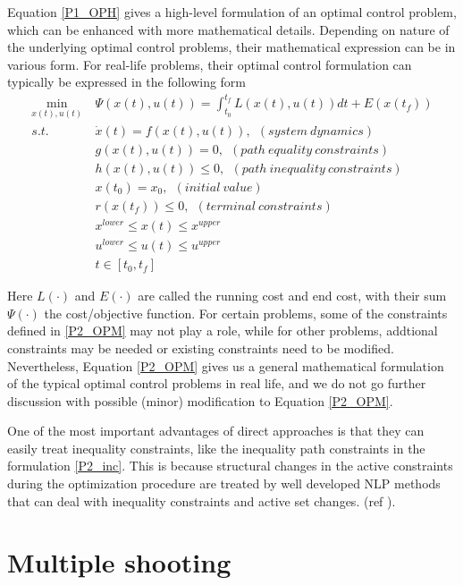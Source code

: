 \documentclass  [
  paper    = a4,
  BCOR     = 10mm,
  twoside,
  fontsize = 12pt,
  fleqn,
  toc      = bibnumbered,
  toc      = listofnumbered,
  numbers  = noendperiod,
  headings = normal,
  listof   = leveldown,
  version  = 3.03
]                                       {scrreprt}
\newcommand{\<}{\langle}
\renewcommand{\>}{\rangle}
\begin{document}
Equation \ref{P1_OPH} gives a high-level formulation of an optimal control problem, which can be enhanced with more mathematical details. Depending on nature of the underlying optimal control problems, their mathematical expression can be in various form. For real-life problems, their optimal control formulation can typically be expressed in the following form  
\begin{subequations}
	\begin{align}
		\underset{x(t), u(t)}{\text{min}}   \ &  \Psi(x(t), u(t))  = \int_{t_0}^{t_f}L(x(t), u(t))dt + E (x(t_f))\\
		s.t.\ \ &  \dot{x} (t) = f(x(t), u(t)), \ \ (system \ dynamics)   \label{P2_sd} \\
		& g(x(t), u(t)) = 0, \ \  (path\  equality\  constraints)  \label{P2_ec}\\
		& h(x(t), u(t)) \leq 0, \ \ (path\  inequality \ constraints)  \label{P2_inc}\\
		& x(t_0) = x_0, \ \ (initial \ value) \\
		& r(x(t_f)) \leq 0, \ \ (terminal \ constraints) \\
		& x^{lower} \leq x(t) \leq x^{upper}    \\ 
		& u^{lower} \leq u(t) \leq u^{upper}    \\ 
		& t \in [t_0, t_f]
	\end{align}
	\label{P2_OPM}
\end{subequations}

Here $L(\cdot)$ and $E(\cdot)$ are called the running cost and end cost, with their sum $\Psi(\cdot)$ the cost/objective function. For certain problems, some of the constraints defined in \ref{P2_OPM} may not play a role, while for other problems, addtional constraints may be needed or existing constraints need to be modified. Nevertheless, Equation \ref{P2_OPM} gives us a general mathematical formulation of the typical optimal control problems in real life, and we do not go further discussion with possible (minor) modification to Equation \ref{P2_OPM}. 

One of the most important advantages of direct approaches is that they can easily treat inequality constraints, like the inequality path constraints in the formulation \ref{P2_inc}. This is because structural changes in the active constraints during the optimization procedure are treated by well developed NLP methods that can deal with inequality constraints and active set changes. (ref \cite{MHHP05}).

\section{Multiple shooting}
\end{document}
